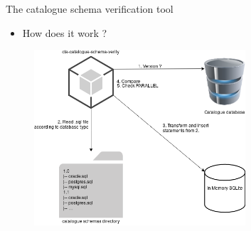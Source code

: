 \documentclass[aspectratio=149]{beamer}
\begin{document}
\begin{frame}{The catalogue schema verification tool}
  \begin{itemize}
    \item How does it work ?
  \end{itemize}
  \begin{center}
	\begin{figure}
      \includegraphics[keepaspectratio, height=0.7\textheight, width=0.7\textwidth]{schema-verify-operation.png}
    \end{figure}
  \end{center}
\end{frame}
\end{document}
